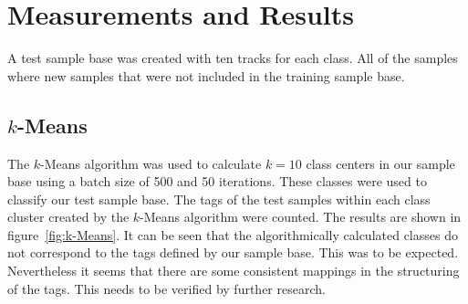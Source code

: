 \section{Measurements and Results}
\label{sec:Measurements}
A test sample base was created with ten tracks for each class. All of the samples where new samples that were not included in the training sample base.

\subsection{$k$-Means}
The $k$-Means algorithm was used to calculate $k=10$ class centers in our sample base using a batch size of 500 and 50 iterations. These classes were used to classify our test sample base. The tags of the test samples within each class cluster created by the $k$-Means algorithm were counted. The results are shown in figure~\ref{fig:k-Means}. It can be seen that the algorithmically calculated classes do not correspond to the tags defined by our sample base. This was to be expected. Nevertheless it seems that there are some consistent mappings in the structuring of the tags. This needs to be verified by further research.

